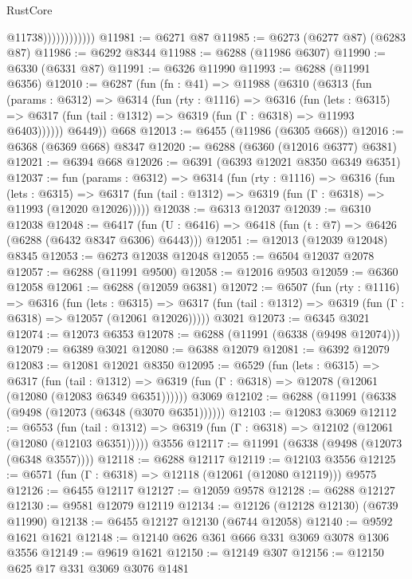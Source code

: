 \begin{lexlean}{RustCore}
\begin{coremodule}
                            @11738))))))))))))
@11981 := @6271 @87
@11985 := @6273 (@6277 @87) (@6283 @87)
@11986 := @6292 @8344
@11988 := @6288 (@11986 @6307)
@11990 := @6330 (@6331 @87)
@11991 := @6326 @11990
@11993 := @6288 (@11991 @6356)
@12010 := @6287
    (fun (fn : @41) =>
    @11988
      (@6310
        (@6313
          (fun (params : @6312) =>
          @6314
            (fun (rty : @1116) =>
            @6316
              (fun (lets : @6315) =>
              @6317 (fun (tail : @1312) => @6319 (fun (Γ : @6318) => @11993 @6403))))))
        @6449))
    @668
@12013 := @6455 (@11986 (@6305 @668))
@12016 := @6368 (@6369 @668) @8347
@12020 := @6288 (@6360 (@12016 @6377) @6381)
@12021 := @6394 @668
@12026 := @6391 (@6393 @12021 @8350 @6349 @6351)
@12037 := fun (params : @6312) =>
  @6314
    (fun (rty : @1116) =>
    @6316
      (fun (lets : @6315) =>
      @6317 (fun (tail : @1312) => @6319 (fun (Γ : @6318) => @11993 (@12020 @12026)))))
@12038 := @6313 @12037
@12039 := @6310 @12038
@12048 := @6417 (fun (U : @6416) => @6418 (fun (t : @7) => @6426 (@6288 (@6432 @8347 @6306) @6443)))
@12051 := @12013 (@12039 @12048) @8345
@12053 := @6273 @12038 @12048
@12055 := @6504 @12037 @2078
@12057 := @6288 (@11991 @9500)
@12058 := @12016 @9503
@12059 := @6360 @12058
@12061 := @6288 (@12059 @6381)
@12072 := @6507
    (fun (rty : @1116) =>
    @6316
      (fun (lets : @6315) =>
      @6317 (fun (tail : @1312) => @6319 (fun (Γ : @6318) => @12057 (@12061 @12026)))))
    @3021
@12073 := @6345 @3021
@12074 := @12073 @6353
@12078 := @6288 (@11991 (@6338 (@9498 @12074)))
@12079 := @6389 @3021
@12080 := @6388 @12079
@12081 := @6392 @12079
@12083 := @12081 @12021 @8350
@12095 := @6529
    (fun (lets : @6315) =>
    @6317
      (fun (tail : @1312) =>
      @6319 (fun (Γ : @6318) => @12078 (@12061 (@12080 (@12083 @6349 @6351))))))
    @3069
@12102 := @6288 (@11991 (@6338 (@9498 (@12073 (@6348 (@3070 @6351))))))
@12103 := @12083 @3069
@12112 := @6553
    (fun (tail : @1312) => @6319 (fun (Γ : @6318) => @12102 (@12061 (@12080 (@12103 @6351)))))
    @3556
@12117 := @11991 (@6338 (@9498 (@12073 (@6348 @3557))))
@12118 := @6288 @12117
@12119 := @12103 @3556
@12125 := @6571 (fun (Γ : @6318) => @12118 (@12061 (@12080 @12119))) @9575
@12126 := @6455 @12117
@12127 := @12059 @9578
@12128 := @6288 @12127
@12130 := @9581 @12079 @12119
@12134 := @12126 (@12128 @12130) (@6739 @11990)
@12138 := @6455 @12127 @12130 (@6744 @12058)
@12140 := @9592 @1621 @1621
@12148 := @12140 @626 @361 @666 @331 @3069 @3078 @1306 @3556
@12149 := @9619 @1621
@12150 := @12149 @307
@12156 := @12150 @625 @17 @331 @3069 @3076 @1481

\end{coremodule}
\end{lexlean}
